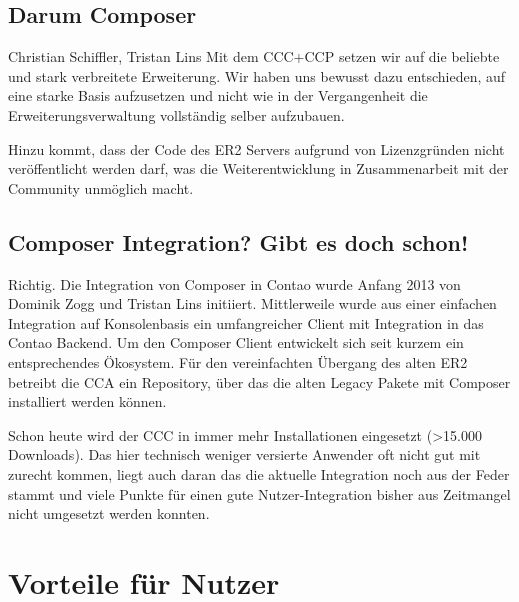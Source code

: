 \documentclass[
paper=a4,
draft=false,%
fontsize=10pt%
]{scrartcl}
\begin{document}
\subsection{Darum Composer}

\begin{emquote}{Christian Schiffler, Tristan Lins}
Mit dem CCC+CCP setzen wir auf die beliebte und stark verbreitete  Erweiterung. Wir haben uns bewusst dazu entschieden, auf eine starke Basis aufzusetzen und nicht wie in der Vergangenheit die Erweiterungsverwaltung vollständig selber aufzubauen.
\end{emquote}

Hinzu kommt, dass der Code des ER2 Servers aufgrund von Lizenzgründen nicht veröffentlicht werden darf, was die Weiterentwicklung in Zusammenarbeit mit der Community unmöglich macht. 

\subsection{Composer Integration? Gibt es doch schon!}

Richtig. Die Integration von Composer in Contao wurde Anfang 2013 von Dominik Zogg und Tristan Lins initiiert. Mittlerweile wurde aus einer einfachen Integration auf Konsolenbasis ein umfangreicher Client mit Integration in das Contao Backend. Um den Composer Client entwickelt sich seit kurzem ein entsprechendes Ökosystem. Für den vereinfachten Übergang des alten ER2 betreibt die CCA ein Repository, über das die alten Legacy Pakete mit Composer installiert werden können.

Schon heute wird der CCC in immer mehr Installationen eingesetzt (>15.000 Downloads). Das hier technisch weniger versierte Anwender oft nicht gut mit zurecht kommen, liegt auch daran das die aktuelle Integration noch aus der Feder  stammt und viele Punkte für einen gute Nutzer-Integration bisher aus Zeitmangel nicht umgesetzt werden konnten.

\newpage

%
%

\section{Vorteile für Nutzer}
\label{sec:pros-for-users}
\end{document}
